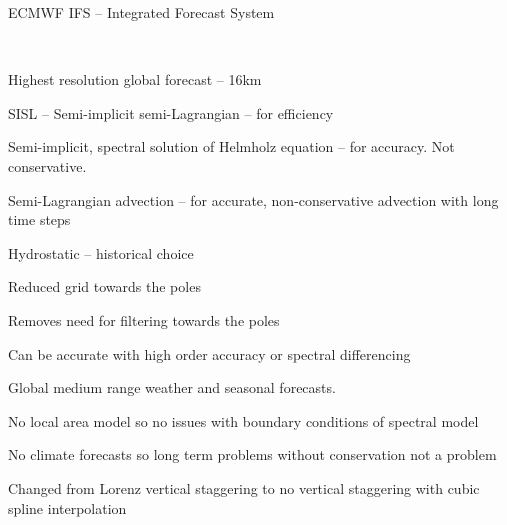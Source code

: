 \begin{slide}{ECMWF IFS -- Integrated Forecast System}

\ \\
\begin{list0}
\item Highest resolution global forecast -- 16km
\item SISL -- Semi-implicit semi-Lagrangian -- for efficiency
\begin{list1}
    \item Semi-implicit, spectral solution of Helmholz equation -- for accuracy. Not conservative.
    \item Semi-Lagrangian advection -- for accurate, non-conservative advection with long time steps
\end{list1}
\item Hydrostatic -- historical choice
\item Reduced grid towards the poles
\begin{list1}
    \item Removes need for filtering towards the poles
    \item Can be accurate with high order accuracy or spectral differencing
\end{list1}
\item Global medium range weather and seasonal forecasts.
\begin{list1}
    \item No local area model so no issues with boundary conditions of spectral model
    \item No climate forecasts so long term problems without conservation not a problem
\end{list1}
\item Changed from Lorenz vertical staggering to no vertical staggering with cubic spline interpolation
\end{list0}
\end{slide}

